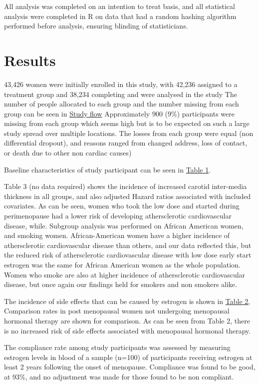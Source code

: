 \documentclass[11pt]{article}
\begin{document}
		All analysis was completed on an intention to treat basis, and all statistical analysis were completed in R \cite{RCoreTeam2012} on data that had a random hashing algorithm performed before analysis, ensuring blinding of statisticians.



	\section{Results}
		43,426 women were initially enrolled in this study, with 42,236 assigned to a treatment group and 38,234 completing and were analysed in the study
		The number of people allocated to each group and the number missing from each group can be seen in  \hyperref[flow]{Study flow}
		Approximately 900 (9\%)  participants were missing from each group which seems high but is to be expected on such a large study spread over multiple locations. 
		The losses from each group were equal (non differential dropout), and reasons ranged from changed address, loss of contact, or death due to other non cardiac causes)


		Baseline characteristics of study participant can be seen in \hyperref[table1]{Table 1}.


		Table 3 (no data required) shows the incidence of increased carotid inter-media thickness in all groups, and also adjusted Hazard ratios associated with included covariates.
		As can be seen, women who took the low dose and started during perimenopause had a lower risk of developing athersclerotic cardiovascular disease, while.
		Subgroup analysis was performed on African American women, and smoking women.
		African-American women have a higher incidence of athersclerotic cardiovascular disease than others, and our data reflected this, but the reduced risk of athersclerotic cardiovascular disease with low dose early start estrogen was the same for African American women as the whole population.
		Women who smoke are also at higher incidence of athersclerotic cardiovascular disease, but once again our findings held for smokers and non smokers alike.


		The incidence of side effects that can be caused by estrogen is shown in \hyperref[table2]{Table 2}, Comparison rates in post menopausal women not undergoing menopausal hormonal therapy are shown for comparison.
		As can be seen from Table 2, there is no increased risk of side effects associated with menopausal hormonal therapy.


		The compliance rate among study participants was assessed by measuring estrogen levels in blood of a sample (n=100) of participants receiving estrogen at least 2 years following the onset of menopause. Compliance was found to be good, at 93\%, and no adjustment was made for those found to be non compliant.
\end{document}
